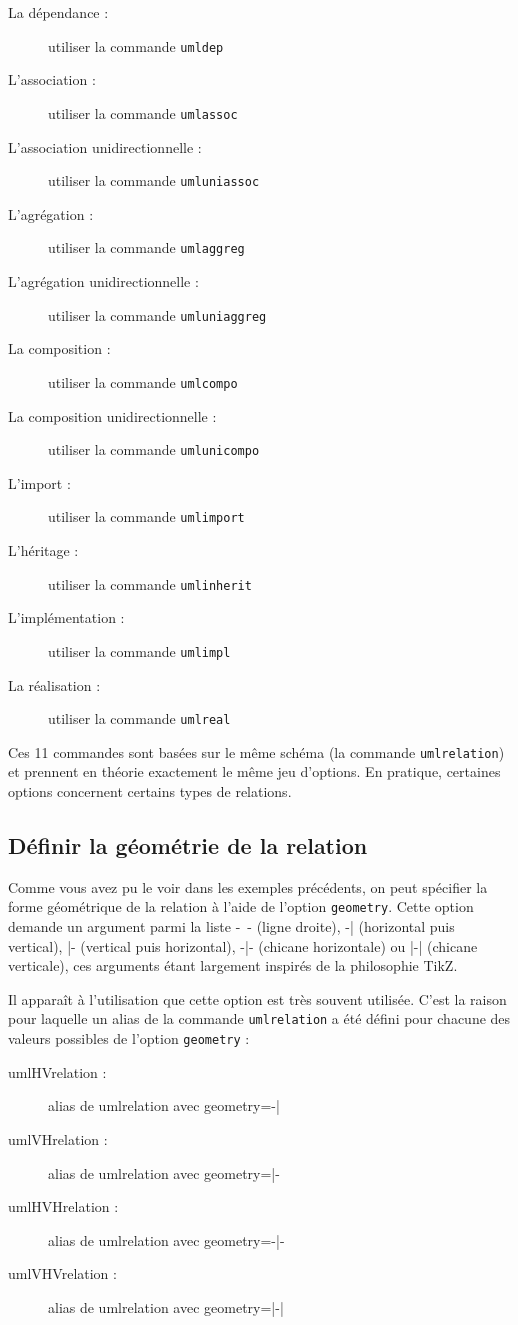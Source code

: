 \documentclass[a4paper,11pt]{report}
\newcommand{\TikZ}{{\sc TikZ}}
\begin{document}
\begin{description}
\item[La dépendance :] utiliser la commande {\tt umldep}
\item[L'association :] utiliser la commande {\tt umlassoc}
\item[L'association unidirectionnelle :] utiliser la commande {\tt umluniassoc}
\item[L'agrégation :] utiliser la commande {\tt umlaggreg}
\item[L'agrégation unidirectionnelle :] utiliser la commande {\tt umluniaggreg}
\item[La composition :] utiliser la commande {\tt umlcompo}
\item[La composition unidirectionnelle :] utiliser la commande {\tt umlunicompo}
\item[L'import :] utiliser la commande {\tt umlimport}
\item[L'héritage :] utiliser la commande {\tt umlinherit}
\item[L'implémentation :] utiliser la commande {\tt umlimpl}
\item[La réalisation :] utiliser la commande {\tt umlreal}
\end{description}

Ces 11 commandes sont basées sur le même schéma (la commande {\tt umlrelation}) et prennent en théorie exactement le même jeu d'options. En pratique, certaines options concernent certains types de relations.

\subsection{Définir la géométrie de la relation}\label{ss.relgeom}

Comme vous avez pu le voir dans les exemples précédents, on peut spécifier la forme géométrique de la relation à l'aide de l'option \hypertarget{geometry}{{\tt geometry}}. Cette option demande un argument parmi la liste -~- (ligne droite), -| (horizontal puis vertical), |- (vertical puis horizontal), -|- (chicane horizontale) ou |-| (chicane verticale), ces arguments étant largement inspirés de la philosophie \TikZ.

Il apparaît à l'utilisation que cette option est très souvent utilisée. C'est la raison pour laquelle un alias de la commande {\tt umlrelation} a été défini pour chacune des valeurs possibles de l'option {\tt geometry} :

\begin{description}
\item[umlHVrelation :] alias de umlrelation avec geometry=-|
\item[umlVHrelation :] alias de umlrelation avec geometry=|-
\item[umlHVHrelation :] alias de umlrelation avec geometry=-|-
\item[umlVHVrelation :] alias de umlrelation avec geometry=|-|
\end{description}
\end{document}
